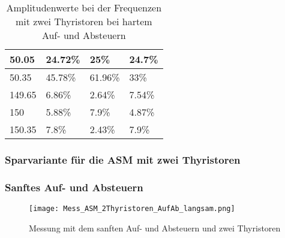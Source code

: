 \begin{appendix}
\begin{table}[ht!]
\begin{tabular}{|l|l|l|l|}
		50.05             & 24.72\%                                                                             & 25\%                                                                                & 24.7\%                                                                              \\ \hline
		50.35             & 45.78\%                                                                             & 61.96\%                                                                             & 33\%                                                                                \\ \hline
		149.65            & 6.86\%                                                                              & 2.64\%                                                                              & 7.54\%                                                                              \\ \hline
		150               & 5.88\%                                                                              & 7.9\%                                                                               & 4.87\%                                                                              \\ \hline
		150.35            & 7.8\%                                                                               & 2.43\%                                                                              & 7.9\%                                                                               \\ \hline
	\end{tabular}
	\caption{Amplitudenwerte bei der Frequenzen mit zwei Thyristoren bei hartem Auf- und Absteuern}\label{tab:Mess_2Thyristoren_Spannung_Widerstand_AufAb_hart}
\end{table}

\newpage
\subsubsection{Sparvariante für die ASM mit zwei Thyristoren}

\subsubsection*{Sanftes Auf- und Absteuern}
\begin{figure}[ht!]
	\centering
	\texttt{[image: Mess\_ASM\_2Thyristoren\_AufAb\_langsam.png]}	
	\caption{Messung mit dem sanften Auf- und Absteuern und zwei Thyristoren}\label{fig:Mess_2Thyristoren_ASM_AufAbFahren_langsam}	
\end{figure}


\end{appendix}
